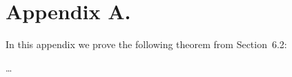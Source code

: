 \documentclass[twoside,11pt]{article}
\begin{document}
\newpage



\vskip 0.2in


\appendix
\section*{Appendix A.}
\label{app:theorem}

In this appendix we prove the following theorem from
Section~6.2:

\ldots
\end{document}
